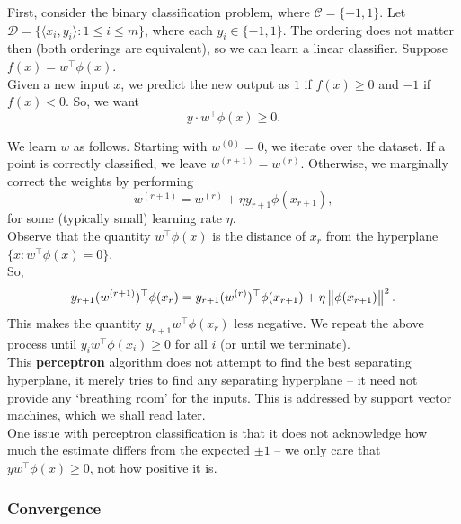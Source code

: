 \documentclass{article}
\begin{document}
			First, consider the binary classification problem, where $\mathcal{C} = \{-1,1\}$. Let $\mathcal{D} = \{ \langle x_i , y_i \rangle : 1 \le i \le m \}$, where each $y_i \in \{-1,1\}$. The ordering does not matter then (both orderings are equivalent), so we can learn a linear classifier. Suppose $f(x) = w^\top \phi(x)$.\\
			Given a new input $x$, we predict the new output as $1$ if $f(x) \ge 0$ and $-1$ if $f(x) < 0$. So, we want
			\[ y\cdot w^\top \phi(x) \ge 0. \]

			We learn $w$ as follows. Starting with $w^{(0)} = 0$, we iterate over the dataset. If a point is correctly classified, we leave $w^{(r+1)} = w^{(r)}$. Otherwise, we marginally correct the weights by performing
			\[ w^{(r+1)} = w^{(r)} + \eta y_{r+1}\phi(x_{r+1}), \]
			for some (typically small) learning rate $\eta$.\\
			Observe that the quantity $w^\top \phi(x)$ is the distance of $x_r$ from the hyperplane $\{x : w^\top\phi(x) = 0\}$.\\
			So,
			\[ y_{r+1}(w^{(r+1)})^\top \phi(x_r) = y_{r+1} (w^{(r)})^\top\phi(x_{r+1}) + \eta\left\lVert\phi(x_{r+1})\right\rVert^2. \]
			This makes the quantity $y_{r+1} w^\top \phi(x_r)$ less negative. We repeat the above process until $y_iw^\top\phi(x_i) \ge 0$ for all $i$ (or until we terminate). \\
			This \textbf{perceptron} algorithm does not attempt to find the best separating hyperplane, it merely tries to find any separating hyperplane -- it need not provide any `breathing room' for the inputs. This is addressed by support vector machines, which we shall read later.\\
			One issue with perceptron classification is that it does not acknowledge how much the estimate differs from the expected $\pm 1$ -- we only care that $yw^\top\phi(x) \ge 0$, not how positive it is.

		\subsubsection{Convergence}
\end{document}
